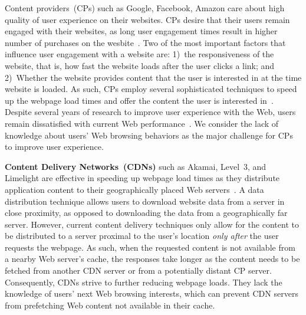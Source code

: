 \documentclass[letterpaper,twocolumn]{article}
\begin{document}
Content providers~(CPs) such as Google, Facebook, Amazon care about high quality of user experience on their websites.
CPs desire that their users remain engaged with their websites, as long user engagement times result in higher number of purchases on the wesbite~\cite{oreilly:businessloss}.
Two of the most important factors that influence user engagement with a website are: 1)~the responsiveness of the website, that is, how fast the website loads after the user clicks a link; and 2)~Whether the website provides content that the user is interested in at the time website is loaded.
As such, CPs employ several sophisticated techniques to speed up the webpage load times and offer the content the user is interested in~\cite{sdch,tcp_fast_open}.
Despite several years of research to improve user experience with the Web, users remain dissatisfied with current Web performance~\cite{rutgers:study}.
We consider the lack of knowledge about users' Web browsing behaviors as the major challenge for CPs to improve user experience.


\textbf{Content Delivery Networks~(CDNs)} such as Akamai, Level~3, and Limelight are effective in speeding up webpage load times as they distribute application content to their geographically placed Web servers~\cite{cdn}.
A data distribution technique allows users to download website data from a server in close proximity, as opposed to downloading the data from a geographically far server.
However, current content delivery techniques only allow for the content to be distributed to a server proximal to the user's location \textit{only after} the user requests the webpage.
As such, when the requested content is not available from a nearby Web server's cache, the responses take longer as the content needs to be fetched from another CDN server or from a potentially distant CP server.
Consequently, CDNs strive to further reducing webpage loads. They lack the knowledge of users' next Web browsing interests, which can prevent CDN servers from prefetching Web content not available in their cache.
\end{document}
